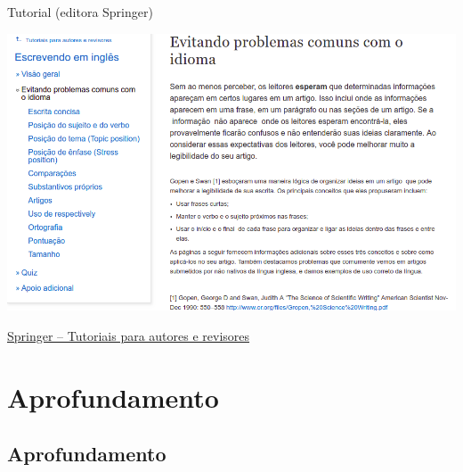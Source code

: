 \documentclass{beamer}
\begin{document}
\begin{frame}{Tutorial (editora Springer)}
  \begin{center}
    \includegraphics[width=.9\textwidth]{Escrita/springer-tutorial}
  \end{center}
  \vfill \scriptsize \hfill
  \href{https://www.springer.com/br/authors-editors/authorandreviewertutorials/writinginenglish/avoiding-common-language-issues/12012044}
  {Springer -- Tutoriais para autores e revisores}
\end{frame}

\section{Aprofundamento}

\subsection{Aprofundamento}
\end{document}

